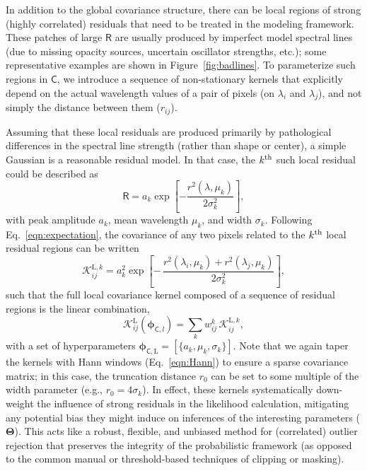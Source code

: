 \documentclass[iop,floatfix,numberedappendix,twocolappendix]{emulateapj}
\newcommand{\vR}{\mathsf{R}}
\newcommand{\vC}{\mathsf{C}}
\newcommand{\vT}{ {\bm \Theta}}
\newcommand{\vp}{ {\bm \phi}}
\newcommand{\KK}{\mathcal{K}}
\newcommand{\Klocal}{\KK^{\textrm{L}}}
\begin{document}
In addition to the global covariance structure, there can be local regions of strong (highly 
correlated) residuals that need to be treated in the modeling framework.  These patches of large 
$\vR$ are usually produced by imperfect model spectral lines (due to missing opacity sources, 
uncertain oscillator strengths, etc.); some representative examples are shown in 
Figure~\ref{fig:badlines}.  To parameterize such regions in $\vC$, we introduce a sequence of 
non-stationary kernels that explicitly depend on the actual wavelength values of a pair of pixels 
(on $\lambda_i$ and $\lambda_j$), and not simply the distance between them ($r_{ij}$).  

Assuming that these local residuals are produced primarily by pathological differences in the 
spectral line strength (rather than shape or center), a simple Gaussian is a reasonable residual 
model.  In that case, the $k^{\rm th}$ such local residual could be described as
\begin{equation}
\vR = a_k \exp \left[ - \frac{r^2(\lambda,\mu_k)}{2\sigma_k^2} \right],
\end{equation}
with peak amplitude $a_k$, mean wavelength $\mu_k$, and width $\sigma_k$.  Following 
Eq.~\ref{eqn:expectation}, the covariance of any two pixels related to the $k^{\rm th}$ local 
residual regions can be written
\begin{equation} \label{eqn:kregion}
  \mathcal{K}^{\textrm{L},k}_{ij} = a_k^2 \exp \left [ - \, \frac{r^2(\lambda_i, \mu_k) + r^2(\lambda_j, \mu_k)}{2 \sigma_k^2}\right ],
\end{equation}
such that the full local covariance kernel composed of a sequence of residual regions is the linear 
combination,
\begin{equation} \label{eqn:klocal}
  \Klocal_{ij}(\vp_{{\mathsf C},l}) = \sum_k w^k_{ij} \, \mathcal{K}^{\textrm{L},k}_{ij},
\end{equation}
with a set of hyperparameters $\vp_{{\mathsf C},\textrm{L}} = [\{a_k, \mu_k, \sigma_k\}]$.  Note that we 
again taper the kernels with Hann windows (Eq.~\ref{eqn:Hann}) to ensure a sparse covariance 
matrix; in this case, the truncation distance $r_0$ can be set to some multiple of the width 
parameter (e.g., $r_0 = 4\sigma_k$).  In effect, these kernels systematically down-weight the 
influence of strong residuals in the likelihood calculation, mitigating any potential bias they 
might induce on inferences of the interesting parameters ($\vT$).  This acts like a robust, 
flexible, and unbiased method for (correlated) outlier rejection that preserves the integrity of 
the probabilistic framework (as opposed to the common manual or threshold-based techniques of 
clipping or masking).  
\end{document}
